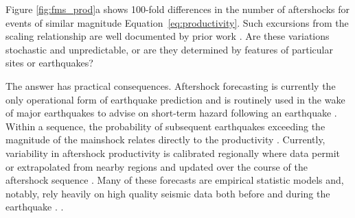 \documentclass[draft, jgrga]{agujournal2018}
\begin{document}
 Figure \ref{fig:fms_prod}a shows 100-fold differences in the number of aftershocks for events of similar magnitude Equation~\ref{eq:productivity}. Such excursions from the scaling relationship are well documented by prior work \citep[e.g.][]{Marsan2017HowAftershocks,Boettcher2004EarthquakeFaults,Page,Tahir2014Aftershock2005}. Are these variations stochastic and unpredictable, or are they determined by features of particular sites or earthquakes?

The answer has practical consequences. Aftershock forecasting is currently the only operational form of earthquake prediction and is routinely used in the wake of major earthquakes to advise on short-term hazard following an earthquake \citep{Reasenberg1989, Page,Hardebeck2018UpdatedParameters}. Within a sequence, the probability of subsequent earthquakes exceeding the magnitude of the mainshock relates directly to the productivity \citep{Reasenberg1989, Reasenberg1999ForeshockEarthquakes}. Currently, variability in aftershock productivity is calibrated regionally where data permit or extrapolated from nearby regions and updated over the course of the aftershock sequence \citep[e.g.][]{Reasenberg1989, Reasenberg1999ForeshockEarthquakes, ogata2017statistics}. Many of these forecasts are empirical statistic models and, notably, rely heavily on high quality seismic data both before and during the earthquake \citep{Gerstenberger2005Real-timeCalifornia, Omi2015Intermediate-termApproaches}.  \citep[e.g.][]{Field2017AForecast}. 
\end{document}
